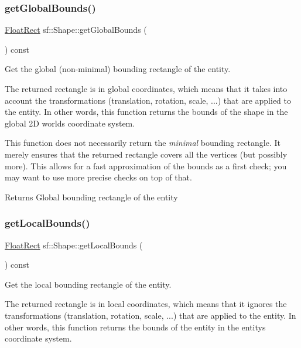 \subsubsection{\texorpdfstring{getGlobalBounds()}{getGlobalBounds()}}
{\footnotesize\ttfamily \mbox{\hyperlink{classsf_1_1_rect}{Float\+Rect}} sf\+::\+Shape\+::get\+Global\+Bounds (\begin{DoxyParamCaption}{ }\end{DoxyParamCaption}) const}



Get the global (non-\/minimal) bounding rectangle of the entity. 

The returned rectangle is in global coordinates, which means that it takes into account the transformations (translation, rotation, scale, ...) that are applied to the entity. In other words, this function returns the bounds of the shape in the global 2D world\textquotesingle{}s coordinate system.

This function does not necessarily return the {\itshape minimal} bounding rectangle. It merely ensures that the returned rectangle covers all the vertices (but possibly more). This allows for a fast approximation of the bounds as a first check; you may want to use more precise checks on top of that.

\begin{DoxyReturn}{Returns}
Global bounding rectangle of the entity \begin{DoxyVerb}\end{DoxyVerb}
 
\end{DoxyReturn}
\mbox{\label{classsf_1_1_shape_ae3294bcdf8713d33a862242ecf706443}} 
\subsubsection{\texorpdfstring{getLocalBounds()}{getLocalBounds()}}
{\footnotesize\ttfamily \mbox{\hyperlink{classsf_1_1_rect}{Float\+Rect}} sf\+::\+Shape\+::get\+Local\+Bounds (\begin{DoxyParamCaption}{ }\end{DoxyParamCaption}) const}



Get the local bounding rectangle of the entity. 

The returned rectangle is in local coordinates, which means that it ignores the transformations (translation, rotation, scale, ...) that are applied to the entity. In other words, this function returns the bounds of the entity in the entity\textquotesingle{}s coordinate system.

